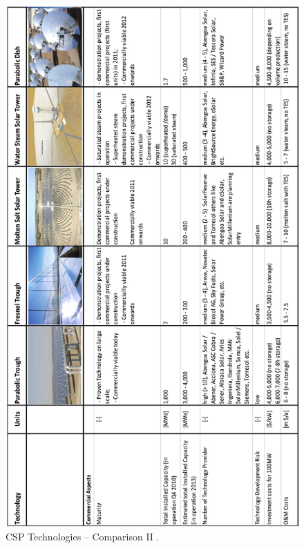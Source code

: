 \begin{figure}[h]  
\centering
\includegraphics[height=0.95\textheight]{FIG/CSPOverview2}
\caption[CSP Technologies – Comparison I]{CSP Technologies – Comparison II \cite{Fichtner2010}.}\label{CSPOverview2}
\end{figure}
\pagebreak
%
\newpage
